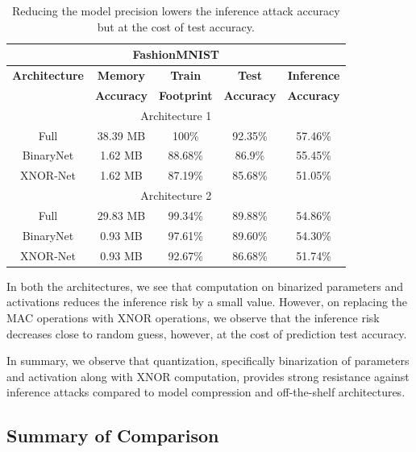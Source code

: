 \begin{table}[!htb]
\begin{center}
\renewcommand\arraystretch{1.5}
\fontsize{6.7pt}{6.7pt}\selectfont
\begin{tabular}{|c|c|c|c|c|}
\hline
\multicolumn{5}{|c|}{\textbf{FashionMNIST}}\\
\hline
\textbf{Architecture} & \textbf{Memory} & \textbf{Train}  & \textbf{Test}  & \textbf{Inference}  \\
 & \textbf{Accuracy} &  \textbf{Footprint} & \textbf{Accuracy} & \textbf{Accuracy}  \\
\hline
\multicolumn{5}{|c|}{Architecture 1}\\
Full & 38.39 MB & 100\% & 92.35\% & \cellcolor{red!25}57.46\%\\
BinaryNet & 1.62 MB & 88.68\% & 86.9\% & \cellcolor{green!25}55.45\%\\
XNOR-Net & 1.62 MB & 87.19\% & 85.68\% & \cellcolor{green!25}51.05\%\\ %
\hline
\multicolumn{5}{|c|}{Architecture 2}\\
Full & 29.83 MB & 99.34\% & 89.88\% & \cellcolor{red!25}54.86\% \\
BinaryNet & 0.93 MB & 97.61\% & 89.60\% & \cellcolor{green!25}54.30\%\\
XNOR-Net & 0.93 MB & 92.67\% & 86.68\% & \cellcolor{green!25}51.74\%\\ %
\hline
\end{tabular}
\end{center}
\caption{Reducing the model precision lowers the inference attack accuracy but at the cost of test accuracy.}
\label{fmnist_quantize}
\end{table}

In both the architectures, we see that computation on  binarized parameters and activations reduces the inference risk by a small value.
However, on replacing the MAC operations with XNOR operations, we observe that the inference risk decreases close to random guess, however, at the cost of prediction test accuracy.

In summary, we observe that quantization, specifically binarization of parameters and activation along with XNOR computation, provides strong resistance against inference attacks compared to model compression and off-the-shelf architectures.

\subsection{Summary of Comparison}

